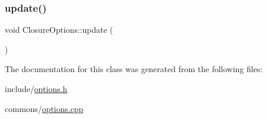 \mbox{\label{class_closure_options_a798c472d0dccee12eac7a81ba47a86f5}} 
\subsubsection{\texorpdfstring{update()}{update()}}
{\footnotesize\ttfamily void Closure\+Options\+::update (\begin{DoxyParamCaption}{ }\end{DoxyParamCaption})}



The documentation for this class was generated from the following files\+:\begin{DoxyCompactItemize}
\item 
include/\mbox{\hyperlink{options_8h}{options.\+h}}\item 
commons/\mbox{\hyperlink{options_8cpp}{options.\+cpp}}\end{DoxyCompactItemize}
